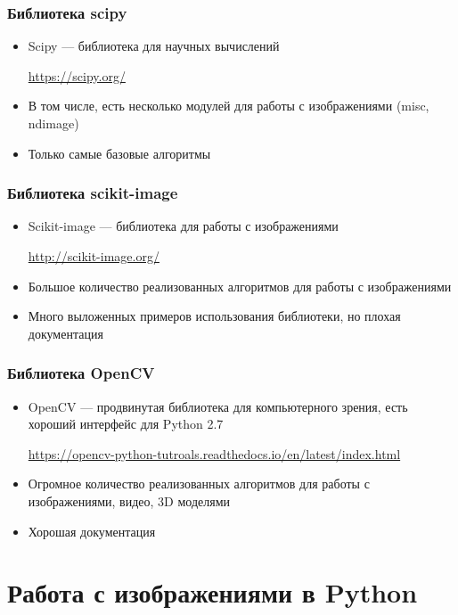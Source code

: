 \documentclass[fleqn, xcolor=x11names]{beamer}
\begin{document}
\begin{frame}[fragile]\frametitle{Библиотека scipy}
\begin{itemize}
\item Scipy --- библиотека для научных вычислений

\href{https://scipy.org/}{https://scipy.org/}

\item В том числе, есть несколько модулей для работы с изображениями (misc, ndimage)

\item Только самые базовые алгоритмы
\end{itemize}
\end{frame}


\begin{frame}[fragile]\frametitle{Библиотека scikit-image}
\begin{itemize}
\item Scikit-image --- библиотека для работы с изображениями

\href{http://scikit-image.org/}{http://scikit-image.org/}

\item Большое количество реализованных алгоритмов для работы с изображениями
\item Много выложенных примеров использования библиотеки, но плохая документация
\end{itemize}
\end{frame}

\begin{frame}[fragile]\frametitle{Библиотека OpenCV}
\begin{itemize}
\item OpenCV --- продвинутая библиотека для компьютерного зрения, есть хороший интерфейс для Python 2.7

\href{https://opencv-python-tutroals.readthedocs.io/en/latest/index.html}{https://opencv-python-tutroals.readthedocs.io/en/latest/index.html}

\item Огромное количество реализованных алгоритмов для работы с изображениями, видео, 3D моделями 

\item Хорошая документация
\end{itemize}
\end{frame}

\section{Работа с изображениями в Python}
\end{document}
